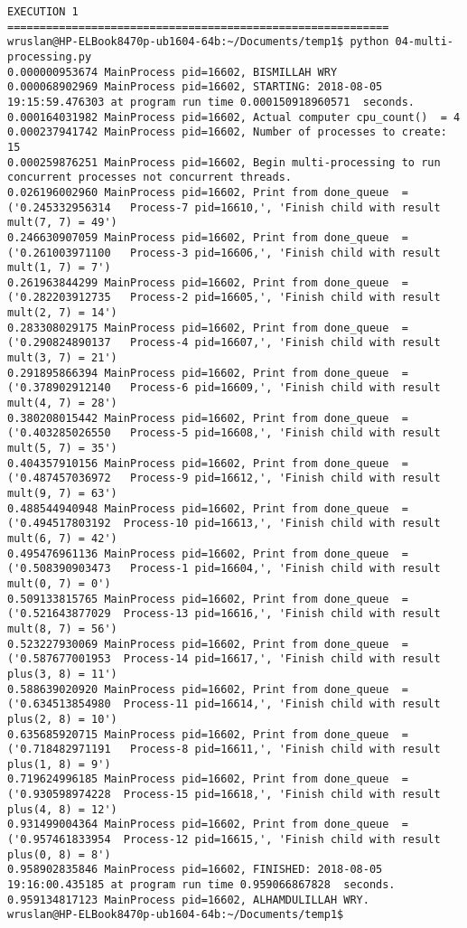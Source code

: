 \begin{lstlisting}[caption={App4-Python Parallel Multiprocessing Codes}, label=App4-Python Parallel Multiprocessing Codes]
EXECUTION 1
===========================================================
wruslan@HP-ELBook8470p-ub1604-64b:~/Documents/temp1$ python 04-multi-processing.py 
0.000000953674 MainProcess pid=16602, BISMILLAH WRY
0.000068902969 MainProcess pid=16602, STARTING: 2018-08-05 19:15:59.476303 at program run time 0.000150918960571  seconds.
0.000164031982 MainProcess pid=16602, Actual computer cpu_count()  = 4 
0.000237941742 MainProcess pid=16602, Number of processes to create: 15
0.000259876251 MainProcess pid=16602, Begin multi-processing to run concurrent processes not concurrent threads.
0.026196002960 MainProcess pid=16602, Print from done_queue  =  ('0.245332956314   Process-7 pid=16610,', 'Finish child with result mult(7, 7) = 49')
0.246630907059 MainProcess pid=16602, Print from done_queue  =  ('0.261003971100   Process-3 pid=16606,', 'Finish child with result mult(1, 7) = 7')
0.261963844299 MainProcess pid=16602, Print from done_queue  =  ('0.282203912735   Process-2 pid=16605,', 'Finish child with result mult(2, 7) = 14')
0.283308029175 MainProcess pid=16602, Print from done_queue  =  ('0.290824890137   Process-4 pid=16607,', 'Finish child with result mult(3, 7) = 21')
0.291895866394 MainProcess pid=16602, Print from done_queue  =  ('0.378902912140   Process-6 pid=16609,', 'Finish child with result mult(4, 7) = 28')
0.380208015442 MainProcess pid=16602, Print from done_queue  =  ('0.403285026550   Process-5 pid=16608,', 'Finish child with result mult(5, 7) = 35')
0.404357910156 MainProcess pid=16602, Print from done_queue  =  ('0.487457036972   Process-9 pid=16612,', 'Finish child with result mult(9, 7) = 63')
0.488544940948 MainProcess pid=16602, Print from done_queue  =  ('0.494517803192  Process-10 pid=16613,', 'Finish child with result mult(6, 7) = 42')
0.495476961136 MainProcess pid=16602, Print from done_queue  =  ('0.508390903473   Process-1 pid=16604,', 'Finish child with result mult(0, 7) = 0')
0.509133815765 MainProcess pid=16602, Print from done_queue  =  ('0.521643877029  Process-13 pid=16616,', 'Finish child with result mult(8, 7) = 56')
0.523227930069 MainProcess pid=16602, Print from done_queue  =  ('0.587677001953  Process-14 pid=16617,', 'Finish child with result plus(3, 8) = 11')
0.588639020920 MainProcess pid=16602, Print from done_queue  =  ('0.634513854980  Process-11 pid=16614,', 'Finish child with result plus(2, 8) = 10')
0.635685920715 MainProcess pid=16602, Print from done_queue  =  ('0.718482971191   Process-8 pid=16611,', 'Finish child with result plus(1, 8) = 9')
0.719624996185 MainProcess pid=16602, Print from done_queue  =  ('0.930598974228  Process-15 pid=16618,', 'Finish child with result plus(4, 8) = 12')
0.931499004364 MainProcess pid=16602, Print from done_queue  =  ('0.957461833954  Process-12 pid=16615,', 'Finish child with result plus(0, 8) = 8')
0.958902835846 MainProcess pid=16602, FINISHED: 2018-08-05 19:16:00.435185 at program run time 0.959066867828  seconds.
0.959134817123 MainProcess pid=16602, ALHAMDULILLAH WRY.
wruslan@HP-ELBook8470p-ub1604-64b:~/Documents/temp1$ 


\end{lstlisting}
